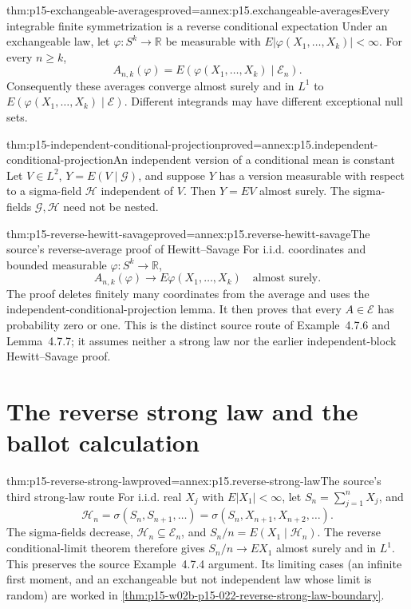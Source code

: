 \begin{hbtheorem}{thm:p15-exchangeable-averages}{proved=annex:p15.exchangeable-averages}{Every integrable finite symmetrization is a reverse conditional expectation}
Under an exchangeable law, let
\(\varphi:S^k\to\mathbb R\) be measurable with
\(E|\varphi(X_1,\ldots,X_k)|<\infty\).
For every \(n\geq k\),
\[
 A_{n,k}(\varphi)=E(\varphi(X_1,\ldots,X_k)\mid\mathcal E_n).
\]
Consequently these averages converge almost surely and in \(L^1\) to
\(E(\varphi(X_1,\ldots,X_k)\mid\mathcal E)\).
Different integrands may have different exceptional null sets.
\end{hbtheorem}

\begin{hblemma}{thm:p15-independent-conditional-projection}{proved=annex:p15.independent-conditional-projection}{An independent version of a conditional mean is constant}
Let \(V\in L^2\), \(Y=E(V\mid\mathcal G)\), and suppose \(Y\)
has a version measurable with respect to a sigma-field \(\mathcal H\)
independent of \(V\). Then \(Y=EV\) almost surely.
The sigma-fields \(\mathcal G,\mathcal H\) need not be nested.
\end{hblemma}

\begin{hbtheorem}{thm:p15-reverse-hewitt-savage}{proved=annex:p15.reverse-hewitt-savage}{The source's reverse-average proof of Hewitt--Savage}
For i.i.d. coordinates and bounded measurable \(\varphi:S^k\to\mathbb R\),
\[
                A_{n,k}(\varphi)\longrightarrow
                     E\varphi(X_1,\ldots,X_k)\quad\text{almost surely}.
\]
The proof deletes finitely many coordinates from the average and
uses the independent-conditional-projection lemma.
It then proves that every \(A\in\mathcal E\) has probability zero or one.
This is the distinct source route of Example~4.7.6 and Lemma~4.7.7;
it assumes neither a strong law nor the earlier independent-block
Hewitt--Savage proof.
\end{hbtheorem}

\section{The reverse strong law and the ballot calculation}

\begin{hbtheorem}{thm:p15-reverse-strong-law}{proved=annex:p15.reverse-strong-law}{The source's third strong-law route}
For i.i.d. real \(X_j\) with \(E|X_1|<\infty\), let
\(S_n=\sum_{j=1}^nX_j\), and
\[
 \mathcal H_n=\sigma(S_n,S_{n+1},\ldots)
             =\sigma(S_n,X_{n+1},X_{n+2},\ldots).
\]
The sigma-fields decrease, \(\mathcal H_n\subseteq\mathcal E_n\),
and \(S_n/n=E(X_1\mid\mathcal H_n)\).
The reverse conditional-limit theorem therefore gives
\(S_n/n\to EX_1\) almost surely and in \(L^1\).
This preserves the source Example~4.7.4 argument.
Its limiting cases (an infinite first moment, and an exchangeable but
not independent law whose limit is random) are worked in
\cref{thm:p15-w02b-p15-022-reverse-strong-law-boundary}.
\end{hbtheorem}

